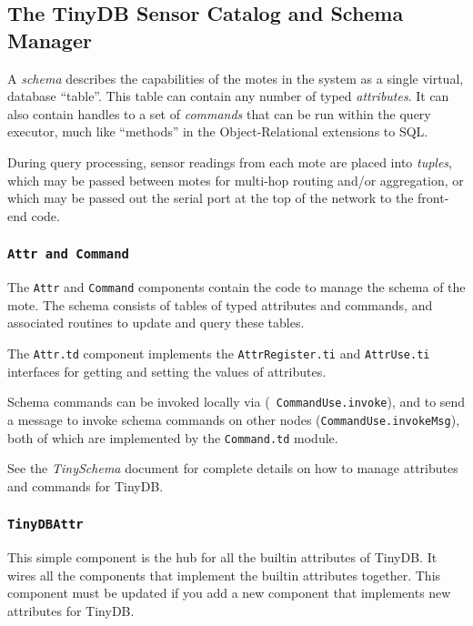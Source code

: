 \documentclass[11pt]{article}
\begin{document}
\subsection {The TinyDB Sensor Catalog and Schema Manager}
\label{sec:catalog}

A {\em schema} describes the capabilities of the motes in the system as a
single virtual, database ``table''.  This table can contain any number
of typed {\em attributes}.  It can also contain handles to a set of
{\em commands} that can be run within the query executor, much like ``methods'' in the Object-Relational
extensions to SQL.

During query processing, sensor readings from each mote are placed
into {\em tuples}, which may be passed between motes for multi-hop
routing and/or aggregation, or which may be passed out the serial port
at the top of the network to the front-end code.

\subsubsection{\tt Attr and Command}
\label{sec:schema}
The {\tt Attr} and {\tt Command} components contain the code 
to manage the schema  of the mote. The schema consists
of tables of
typed attributes and commands, and associated routines to
update and query these tables.

The {\tt Attr.td} component implements the {\tt AttrRegister.ti} and {\tt AttrUse.ti} interfaces
for getting and setting the values of attributes.  

Schema commands can be invoked locally via ({\tt
CommandUse.invoke}), and to send a message to invoke schema
commands on other nodes ({\tt CommandUse.invokeMsg}), both of
which are implemented by the {\tt Command.td} module.

See the {\em TinySchema} document for complete details on how to manage
attributes and commands for TinyDB.

\subsubsection {\tt TinyDBAttr}
\label{sec:attr}
This simple component is the hub for all the
builtin attributes of TinyDB.  It wires all the components that
implement the builtin attributes together.  This component
must be updated if you add a new component that implements
new attributes for TinyDB.
\end{document}
